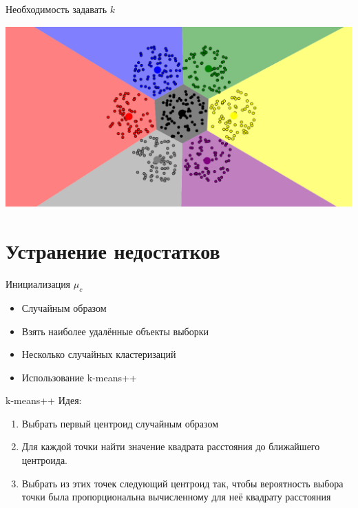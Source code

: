 \documentclass[10pt]{beamer}
\begin{document}
\begin{frame}{Необходимость задавать $k$}
	\begin{center}
	  \includegraphics[width= \textwidth, keepaspectratio = true]{images/k_means_k7}  
	\end{center}
\end{frame}

\section{Устранение недостатков}

\begin{frame}{Инициализация $\mu_c$}
  \begin{itemize} [<+->]
    \item Случайным образом
    \item Взять наиболее удалённые объекты выборки
    \item Несколько случайных кластеризаций
    \item Использование k-means++
  \end{itemize}
\end{frame}

\begin{frame}{k-means++}
	\alert{Идея}:\\
	\begin{enumerate}
		\item Выбрать первый центроид случайным образом
		\item Для каждой точки найти значение квадрата расстояния до ближайшего центроида.
		\item Выбрать из этих точек следующий центроид так, чтобы вероятность выбора точки была пропорциональна вычисленному для неё квадрату расстояния
	\end{enumerate}
\end{frame}
\end{document}
